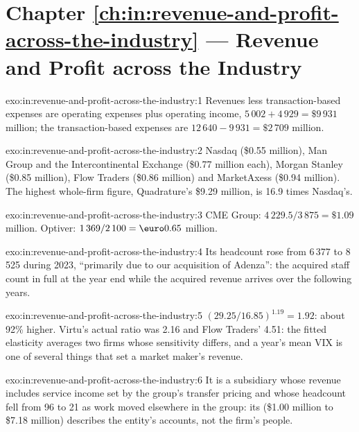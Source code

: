 \section*{Chapter \ref{ch:in:revenue-and-profit-across-the-industry} --- Revenue and Profit across the Industry}

\begin{solution}{exo:in:revenue-and-profit-across-the-industry:1}
Revenues less transaction-based expenses are operating expenses plus operating income, $5\,002+4\,929=\$9\,931$ million;
the transaction-based expenses are $12\,640-9\,931=\$2\,709$ million.
\end{solution}

\begin{solution}{exo:in:revenue-and-profit-across-the-industry:2}
Nasdaq (\$0.55 million), Man Group and the Intercontinental Exchange (\$0.77 million each), Morgan Stanley (\$0.85
million), Flow Traders (\$0.86 million) and MarketAxess (\$0.94 million). The highest whole-firm figure, Quadrature's
\$9.29 million, is 16.9 times Nasdaq's.
\end{solution}

\begin{solution}{exo:in:revenue-and-profit-across-the-industry:3}
CME Group: $4\,229.5/3\,875=\$1.09$ million. Optiver: $1\,369/2\,100=\text{\euro}0.65$ million.
\end{solution}

\begin{solution}{exo:in:revenue-and-profit-across-the-industry:4}
Its headcount rose from 6\,377 to 8\,525 during 2023, ``primarily due to our acquisition of Adenza'': the acquired staff
count in full at the year end while the acquired revenue arrives over the following years.
\end{solution}

\begin{solution}{exo:in:revenue-and-profit-across-the-industry:5}
$(29.25/16.85)^{1.19}=1.92$:  about 92\% higher. Virtu's actual ratio was 2.16 and Flow Traders' 4.51:
the fitted elasticity averages two firms whose sensitivity differs, and a year's mean VIX is one of several things that
set a market maker's revenue.
\end{solution}

\begin{solution}{exo:in:revenue-and-profit-across-the-industry:6}
It is a subsidiary whose revenue includes service income set by the group's transfer pricing and whose headcount fell
from 96 to 21 as work moved elsewhere in the group: its  (\$1.00 million to \$7.18 million) describes the
entity's accounts, not the firm's people.
\end{solution}

